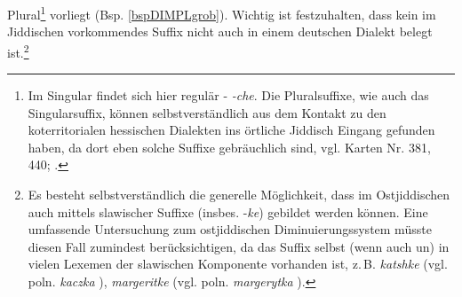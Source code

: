Plural\footnote{Im Singular findet sich hier regulär - \textit{-che}. Die Pluralsuffixe, wie auch das Singularsuffix, können selbstverständlich aus dem Kontakt zu den koterritorialen hessischen Dialekten ins örtliche Jiddisch Eingang gefunden haben, da dort eben solche Suffixe gebräuchlich sind, vgl.  Karten Nr. 381, 440; \textcite[86]{Friebertshaeuser1987}.} vorliegt (Bsp. \ref{bspDIMPLgrob}). Wichtig ist festzuhalten, dass kein im Jiddischen vorkommendes Suffix nicht auch in einem deutschen Dialekt belegt ist.\footnote{Es besteht selbstverständlich die generelle Möglichkeit, dass im Ostjiddischen  auch mittels slawischer Suffixe (insbes. -\textit{ke}) gebildet werden können. Eine umfassende Untersuchung zum ostjiddischen Diminuierungssystem müsste diesen Fall zumindest berücksichtigen, da das Suffix selbst (wenn auch un) in vielen Lexemen der slawischen  Komponente vorhanden ist, z.\,B.  \textit{katshke}  (vgl. poln. \textit{kaczka} ),  \textit{margeritke}  (vgl. poln. \textit{margerytka} ).}\\

